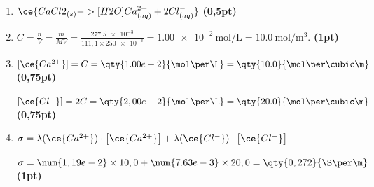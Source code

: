 \begin{enumerate}
    \item $\ce{CaCl2_{(s)} ->[H2O] Ca^{2+}_{(aq)} + 2Cl^-_{(aq)}}$
          \hfill\textbf{(0,5pt)}

    \item $C=\frac{n}{V}=\frac{m}{MV}=
          \frac{\num{277.5e-3}}{111,1\times\num{250e-3}}=
          \qty{1.00e-2}{\mol\per\L}=\qty{10.0}{\mol\per\cubic\m}$.
          \hfill\textbf{(1pt)}

    \item $[\ce{Ca^{2+}}]=C=\qty{1.00e-2}{\mol\per\L}=
          \qty{10.0}{\mol\per\cubic\m}$
          \hfill\textbf{(0,75pt)}

          $[\ce{Cl^-}]=2C=\qty{2,00e-2}{\mol\per\L}=
          \qty{20.0}{\mol\per\cubic\m}$
          \hfill\textbf{(0,75pt)}

    \item $\sigma=\lambda(\ce{Ca^{2+}})\cdot\bigl[\ce{Ca^{2+}}\bigr]+
          \lambda(\ce{Cl^-})\cdot\bigl[\ce{Cl^-}\bigr]$
          
          $\sigma=\num{1,19e-2}\times10,0+\num{7.63e-3}\times20,0=
          \qty{0,272}{\S\per\m}$
          \hfill\textbf{(1pt)}
\end{enumerate}
